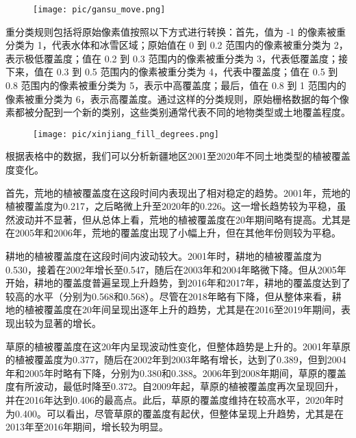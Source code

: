 \documentclass{article}
\begin{document}
		\par						\begin{figure}[H]  %
			\centering
			\texttt{[image: pic/gansu\_move.png]} %
		\end{figure}
		重分类规则包括将原始像素值按照以下方式进行转换：首先，值为 -1 的像素被重分类为 1，代表水体和冰雪区域；原始值在 0 到 0.2 范围内的像素被重分类为 2，表示极低覆盖度；值在 0.2 到 0.3 范围内的像素被重分类为 3，代表低覆盖度；接下来，值在 0.3 到 0.5 范围内的像素被重分类为 4，代表中覆盖度；值在 0.5 到 0.8 范围内的像素被重分类为 5，表示中高覆盖度；最后，值在 0.8 到 1 范围内的像素被重分类为 6，表示高覆盖度。通过这样的分类规则，原始栅格数据的每个像素都被分配到一个新的类别，这些类别通常代表不同的地物类型或土地覆盖程度。
		
		\begin{figure}[H]  %
			\centering
			\texttt{[image: pic/xinjiang\_fill\_degrees.png]} %
		\end{figure}
				
		\par 根据表格中的数据，我们可以分析新疆地区2001至2020年不同土地类型的植被覆盖度变化。
		
		首先，荒地的植被覆盖度在这段时间内表现出了相对稳定的趋势。2001年，荒地的植被覆盖度为0.217，之后略微上升至2020年的0.226。这一增长趋势较为平稳，虽然波动并不显著，但从总体上看，荒地的植被覆盖度在20年期间略有提高。尤其是在2005年和2006年，荒地的覆盖度出现了小幅上升，但在其他年份则较为平稳。
		
		耕地的植被覆盖度在这段时间内波动较大。2001年时，耕地的植被覆盖度为0.530，接着在2002年增长至0.547，随后在2003年和2004年略微下降。但从2005年开始，耕地的覆盖度普遍呈现上升趋势，到2016年和2017年，耕地的覆盖度达到了较高的水平（分别为0.568和0.568）。尽管在2018年略有下降，但从整体来看，耕地的植被覆盖度在20年间呈现出逐年上升的趋势，尤其是在2016至2019年期间，表现出较为显著的增长。
		
		草原的植被覆盖度在这20年内呈现波动性变化，但整体趋势是上升的。2001年草原的植被覆盖度为0.377，随后在2002年到2003年略有增长，达到了0.389，但到2004年和2005年时略有下降，分别为0.380和0.388。2006年到2008年期间，草原的覆盖度有所波动，最低时降至0.372。自2009年起，草原的植被覆盖度再次呈现回升，并在2016年达到0.406的最高点。此后，草原的覆盖度维持在较高水平，2020年时为0.400。可以看出，尽管草原的覆盖度有起伏，但整体呈现上升趋势，尤其是在2013年至2016年期间，增长较为明显。
		
\end{document}
